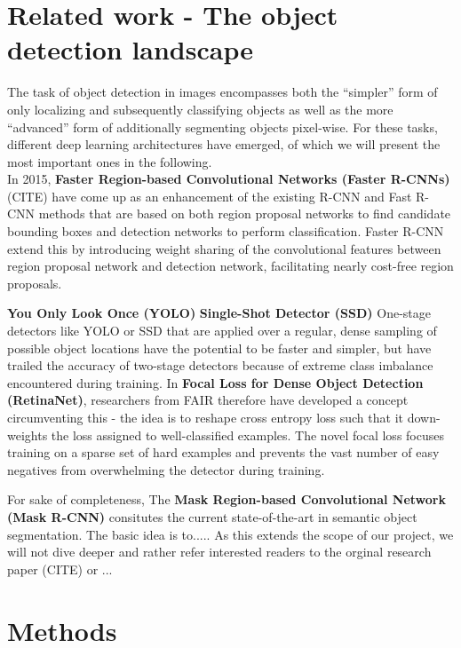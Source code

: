 \documentclass[a4paper]{article}
\begin{document}
\section{Related work - The object detection landscape}
The task of object detection in images encompasses both the ``simpler'' form of only localizing and subsequently classifying objects as well as the more ``advanced'' form of additionally segmenting objects pixel-wise. For these tasks, different deep learning architectures have emerged, of which we will present the most important ones in the following.\\ In 2015, \textbf{Faster Region-based Convolutional Networks (Faster R-CNNs)} (CITE) have come up as an enhancement of the existing R-CNN and Fast R-CNN methods that are based on both region proposal networks to find candidate bounding boxes and detection networks to perform classification. Faster R-CNN extend this by introducing weight sharing of the convolutional features between region proposal network and detection network, facilitating nearly cost-free region proposals. 

\textbf{You Only Look Once (YOLO)}
\textbf{Single-Shot Detector (SSD)}
One-stage detectors like YOLO or SSD that are applied over a regular, dense sampling of possible object locations have the potential to be faster and simpler, but have trailed the accuracy of two-stage detectors because of extreme class imbalance encountered during training.
In \textbf{Focal Loss for Dense Object Detection (RetinaNet)}, researchers from FAIR therefore have developed a concept circumventing this - the idea is to reshape cross entropy loss such that it down-weights the loss assigned to well-classified examples. The novel focal loss focuses training on a sparse set of hard examples and prevents the vast number of easy negatives from overwhelming the detector during training. 



For sake of completeness, The \textbf{Mask Region-based Convolutional Network (Mask R-CNN)} consitutes the current state-of-the-art in semantic object segmentation. The basic idea is to.....
As this extends the scope of our project, we will not dive deeper and rather refer interested readers to the orginal research paper (CITE) or ...
\section{Methods}
\end{document}
